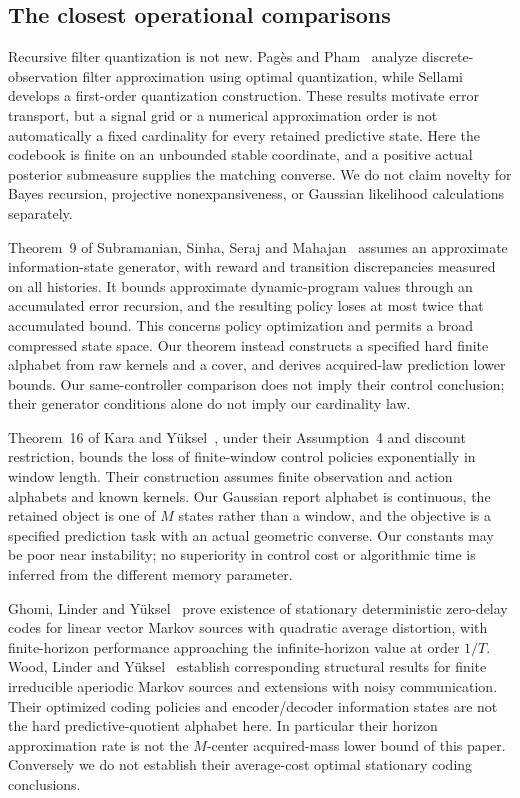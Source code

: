 \subsection{The closest operational comparisons}
Recursive filter quantization is not new. Pag\`es and Pham~\cite{pages} analyze discrete-observation filter approximation using optimal quantization, while Sellami~\cite{sellami} develops a first-order quantization construction. These results motivate error transport, but a signal grid or a numerical approximation order is not automatically a fixed cardinality for every retained predictive state. Here the codebook is finite on an unbounded stable coordinate, and a positive actual posterior submeasure supplies the matching converse. We do not claim novelty for Bayes recursion, projective nonexpansiveness, or Gaussian likelihood calculations separately.

Theorem~9 of Subramanian, Sinha, Seraj and Mahajan~\cite{ais} assumes an approximate information-state generator, with reward and transition discrepancies measured on all histories. It bounds approximate dynamic-program values through an accumulated error recursion, and the resulting policy loses at most twice that accumulated bound. This concerns policy optimization and permits a broad compressed state space. Our theorem instead constructs a specified hard finite alphabet from raw kernels and a cover, and derives acquired-law prediction lower bounds. Our same-controller comparison does not imply their control conclusion; their generator conditions alone do not imply our cardinality law.

Theorem~16 of Kara and Y\"uksel~\cite{kara}, under their Assumption~4 and discount restriction, bounds the loss of finite-window control policies exponentially in window length. Their construction assumes finite observation and action alphabets and known kernels. Our Gaussian report alphabet is continuous, the retained object is one of $M$ states rather than a window, and the objective is a specified prediction task with an actual geometric converse. Our constants may be poor near instability; no superiority in control cost or algorithmic time is inferred from the different memory parameter.

Ghomi, Linder and Y\"uksel~\cite{ghomi} prove existence of stationary deterministic zero-delay codes for linear vector Markov sources with quadratic average distortion, with finite-horizon performance approaching the infinite-horizon value at order $1/T$. Wood, Linder and Y\"uksel~\cite{wood} establish corresponding structural results for finite irreducible aperiodic Markov sources and extensions with noisy communication. Their optimized coding policies and encoder/decoder information states are not the hard predictive-quotient alphabet here. In particular their horizon approximation rate is not the $M$-center acquired-mass lower bound of this paper. Conversely we do not establish their average-cost optimal stationary coding conclusions.


